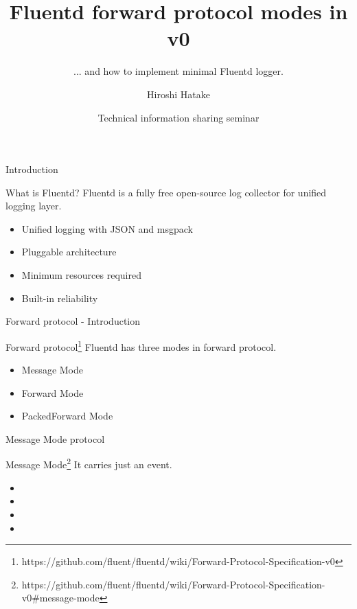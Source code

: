 \documentclass[12pt, unicode]{beamer}
\title{Fluentd forward protocol modes in v0}
\subtitle{... and how to implement minimal Fluentd logger.}
\author{Hiroshi Hatake}
\date[2016/04/08]{Technical information sharing seminar}
\begin{document}
\frame{\maketitle}

\begin{frame}{Introduction}
\begin{block}{What is Fluentd?}
Fluentd is a fully free open-source log collector for unified logging layer.
\end{block}
\begin{itemize}
\item<2-> Unified logging with JSON and msgpack
\item<3-> Pluggable architecture
\item<4-> Minimum resources required
\item<5-> Built-in reliability
\end{itemize}
\end{frame}

\begin{frame}{Forward protocol - Introduction}
\begin{block}{Forward protocol\footnote[frame]{https://github.com/fluent/fluentd/wiki/Forward-Protocol-Specification-v0}}
Fluentd has three modes in forward protocol.
\end{block}
\begin{itemize}
\item<1-> Message Mode
\item<2-> Forward Mode
\item<3-> PackedForward Mode
\end{itemize}
\end{frame}

\begin{frame}{Message Mode protocol}
\begin{block}{Message Mode\footnote[frame]{https://github.com/fluent/fluentd/wiki/Forward-Protocol-Specification-v0\#message-mode}}
It carries just an event.
\end{block}
\begin{itemize}
\item {}
\item {}
\item {}
\item {}
\end{itemize}
\end{frame}
\end{document}
